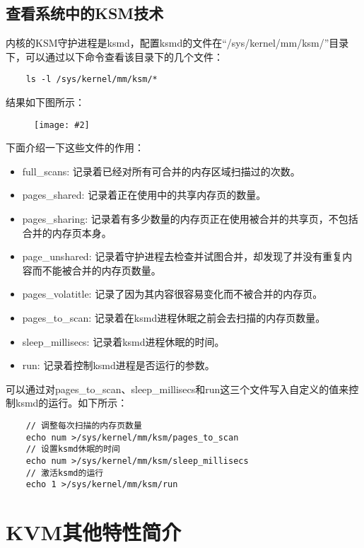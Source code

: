 \documentclass[a4paper,left=2.5cm,right=2.5cm,11pt]{article}
\newcommand{\sizedfic}[2]{\begin{figure}[H]
		\center
		\texttt{[image: \#2]}
	\end{figure}}
\begin{document}
\subsection{查看系统中的KSM技术}
	内核的KSM守护进程是ksmd，配置ksmd的文件在“/sys/kernel/mm/ksm/”目录下，可以通过以下命令查看该目录下的几个文件：
	\begin{lstlisting}
	ls -l /sys/kernel/mm/ksm/*
	\end{lstlisting}

	结果如下图所示：
	\sizedfic{0.9}{4.png}

	下面介绍一下这些文件的作用：
	\begin{itemize}
		\item full\_scans: 记录着已经对所有可合并的内存区域扫描过的次数。
		\item pages\_shared: 记录着正在使用中的共享内存页的数量。
		\item pages\_sharing: 记录着有多少数量的内存页正在使用被合并的共享页，不包括合并的内存页本身。
		\item page\_unshared: 记录着守护进程去检查并试图合并，却发现了并没有重复内容而不能被合并的内存页数量。
		\item pages\_volatitle: 记录了因为其内容很容易变化而不被合并的内存页。
		\item pages\_to\_scan: 记录着在ksmd进程休眠之前会去扫描的内存页数量。
		\item sleep\_millisecs: 记录着ksmd进程休眠的时间。
		\item run: 记录着控制ksmd进程是否运行的参数。
	\end{itemize}

	可以通过对pages\_to\_scan、sleep\_millisecs和run这三个文件写入自定义的值来控制ksmd的运行。如下所示：
	\begin{lstlisting}
	// 调整每次扫描的内存页数量
	echo num >/sys/kernel/mm/ksm/pages_to_scan
	// 设置ksmd休眠的时间
	echo num >/sys/kernel/mm/ksm/sleep_millisecs
	// 激活ksmd的运行
	echo 1 >/sys/kernel/mm/ksm/run
	\end{lstlisting}

\clearpage

\section{KVM其他特性简介}
\end{document}
